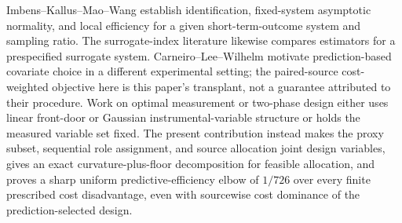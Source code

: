 Imbens--Kallus--Mao--Wang establish identification, fixed-system asymptotic normality, and local efficiency for a given short-term-outcome system and sampling ratio. The surrogate-index literature likewise compares estimators for a prespecified surrogate system. Carneiro--Lee--Wilhelm motivate prediction-based covariate choice in a different experimental setting; the paired-source cost-weighted objective here is this paper's transplant, not a guarantee attributed to their procedure. Work on optimal measurement or two-phase design either uses linear front-door or Gaussian instrumental-variable structure or holds the measured variable set fixed. The present contribution instead makes the proxy subset, sequential role assignment, and source allocation joint design variables, gives an exact curvature-plus-floor decomposition for feasible allocation, and proves a sharp uniform predictive-efficiency elbow of \(1/726\) over every finite prescribed cost disadvantage, even with sourcewise cost dominance of the prediction-selected design.